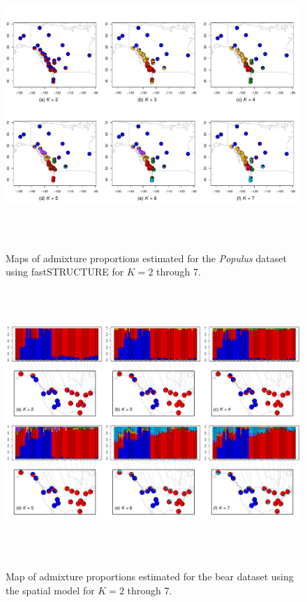 \documentclass[10pt,letterpaper]{article}
\begin{document}
\begin{figure}
	\centering
		{\includegraphics[width=6in,height=4in]{figs/populus/poplar_fastStr_results.pdf}}
	\caption{
	Maps of admixture proportions estimated for the \textit{Populus} dataset 
	using fastSTRUCTURE \cite{fastStructure} for $K=2$ through 7.
    }\label{populus_fastStr}
\end{figure}

\begin{figure}
	\centering
		{\includegraphics[width=6in,height=4in]{figs/bears/bear_sp_results.pdf}}
	\caption{
	Map of admixture proportions estimated for the bear dataset 
	using the spatial model for $K=2$ through 7.
    }\label{bear_sp_pies}
\end{figure}
\end{document}
